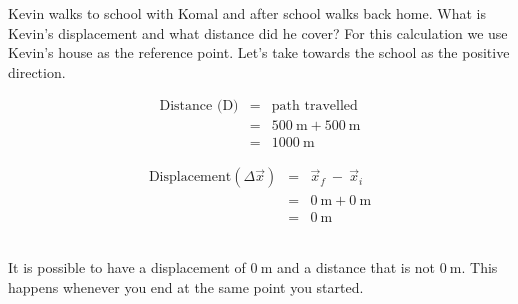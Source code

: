       \label{m38788*id63667}Kevin walks to school with Komal and after school walks back home. What is Kevin's displacement and what distance did he cover?
For this calculation we use Kevin's house as the reference point. Let's take towards the school as the positive direction.\\
\begin{minipage}{0.5\textwidth}
\begin{eqnarray*}
\text{Distance (D)} &=& \text{path~travelled}\\
&=&500\ \text{m} + 500\ \text{m}\\
&=&1000\ \text{m}
\end{eqnarray*}
\end{minipage}
\begin{minipage}{0.5\textwidth}
\begin{eqnarray*}
\text{Displacement} (\Delta \vec{x}) &=& \vec{x}_f~ - ~ \vec{x}_i\\
&=&0\ \text{m} + 0\ \text{m}\\
&=&0\ \text{m}
\end{eqnarray*}
\end{minipage}\vspace{\baselineskip}\\ 
      \label{m38788*id63886}It is possible to have a displacement of $0~\text{m}$ and a distance that is not $0~\text{m}$. This happens whenever you end at the same point you started. 

